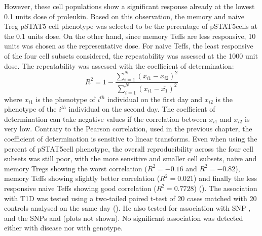 However, these cell populations show a significant response already at the lowest 0.1 units dose of proleukin.
Based on this observation, the memory and naive Treg pSTAT5 cell phenotype was selected to be the percentage of pSTAT5\positive cells at the 0.1 units dose.
On the other hand, since memory Teffs are less responsive, 10 units was chosen as the representative dose.
For naive Teffs, the least responsive of the four cell subsets considered, the repeatability was assessed at the 1000 unit dose.
The repeatability was assessed with the coefficient of determination:
\[
  R^2 = 1 - \frac{\sum_{i=1}^N (x_{i1}-x_{i2})^2}{\sum_{i=1}^N (x_{i1}-\overline{x_1})^2}
\]
where $x_{i1}$ is the phenotype of $i^{th}$ individual on the first day and $x_{i2}$
is the phenotype of the $i^{th}$ individual on the second day.
The coefficient of determination can take negative values if the correlation between $x_{i1}$ and $x_{i2}$ is very low.
Contrary to the Pearson correlation, used in the previous chapter, the coefficient of determination is sensitive to linear transforms.
Even when using the percent of pSTAT5\positive cell phenotype,
the overall reproducibility across the four cell subsets was still poor,
with the more sensitive and smaller cell subsets,
naive and memory Tregs showing the worst correlation ($R^2=-0.16$ and $R^2=-0.82$), memory Teffs showing slightly better correlation ($R^2=0.021$)
and finally the less responsive naive Teffs showing good correlation ($R^2=0.7728$) ().
The association with \gls{T1D} was tested using a two-tailed paired t-test of 20 cases matched with 20 controls analysed on the same day ().
He also tested for association with  SNP , and the
 SNPs  and  (plots not shown).
No significant association was detected either with disease nor with genotype.

